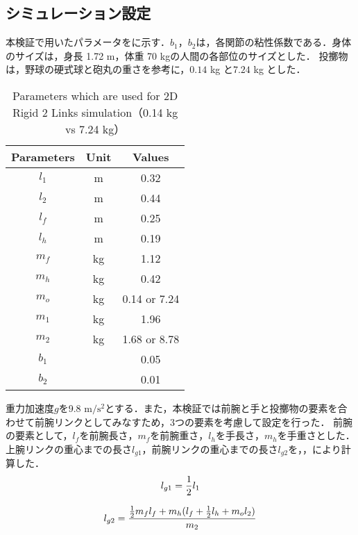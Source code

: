 \subsection{シミュレーション設定}
本検証で用いたパラメータをに示す\cite{irving}．$b_{1}$，$b_{2}$は，各関節の粘性係数である．身体のサイズは，身長 1.72 m，体重 70 kgの人間の各部位のサイズとした．
投擲物は，野球の硬式球と砲丸の重さを参考に，$0.14$ kg\cite{horiuchi} と$7.24$ kg\cite{haq} とした．
\begin{table}[tb]
  \begin{center}
    \caption{Parameters which are used for 2D Rigid 2 Links simulation（0.14 kg vs 7.24 kg）}
    \begin{tabular}{c|c|c}
      \hline
      Parameters & Unit & Values \\
      \hline
      $l_{1}$ & m & 0.32 \\
      $l_{2}$ & m & 0.44 \\
      $l_{f}$ & m & 0.25 \\
      $l_{h}$ & m & 0.19 \\
      $m_{f}$ & kg & 1.12 \\
      $m_{h}$ & kg & 0.42 \\
      $m_{o}$ & kg & 0.14 or 7.24 \\
      $m_{1}$ & kg & 1.96 \\
      $m_{2}$ & kg & 1.68 or 8.78 \\
      $b_{1}$ &  & 0.05 \\
      $b_{2}$ &  & 0.01 \\
      \hline
    \end{tabular}
  \end{center}
\end{table}
重力加速度$g$を9.8 $\mathrm{m/s^{2}}$とする．また，本検証では前腕と手と投擲物の要素を合わせて前腕リンクとしてみなすため，3つの要素を考慮して設定を行った．
前腕の要素として，$l_{f}$を前腕長さ，$m_{f}$を前腕重さ，$l_{h}$を手長さ，$m_{h}$を手重さとした．\\
上腕リンクの重心までの長さ$l_{g1}$，前腕リンクの重心までの長さ$l_{g2}$を，，により計算した．
\begin{eqnarray}
  \equlabel{2.27}
  l_{g1}=\frac{1}{2}l_{1}
\end{eqnarray}

\begin{eqnarray}
  \equlabel{2.28}
  l_{g2}=\frac{\frac{1}{2}m_{f}l_{f}+m_{h}(l_{f}+\frac{1}{2}l_{h}+m_{o}l_{2})}{m_{2}}
\end{eqnarray}

